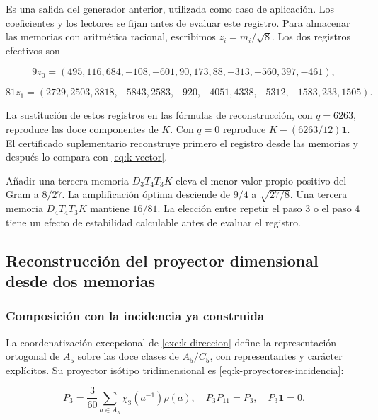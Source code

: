 Es una salida del generador anterior, utilizada como caso de
aplicación. Los coeficientes y los lectores se fijan antes de
evaluar este registro. Para almacenar las memorias con aritmética
racional, escribimos \(z_i=m_i/\sqrt8\).
Los dos registros efectivos son



\[
9z_0=(495,116,684,-108,-601,90,173,88,-313,-560,397,-461),
\]





\begin{equation}
81z_1=(2729,2503,3818,-5843,2583,-920,-4051,4338,-5312,-1583,233,1505).
\label{nuc11:eq:11}
\end{equation}



La sustitución de estos registros en las fórmulas de reconstrucción,
con \(q=6263\), reproduce las doce componentes de \(K\).
Con \(q=0\) reproduce \(K-(6263/12)\mathbf1\).
El certificado suplementario reconstruye primero el registro desde
las memorias y después lo compara con \eqref{eq:k-vector}.

Añadir una tercera memoria \(D_3T_4T_3K\) eleva el menor valor
propio positivo del Gram a \(8/27\).
La amplificación óptima desciende de \(9/4\) a \(\sqrt{27/8}\).
Una tercera memoria \(D_4T_4T_3K\) mantiene \(16/81\).
La elección entre repetir el paso \(3\) o el paso \(4\) tiene
un efecto de estabilidad calculable antes de evaluar el registro.

\subsection{Reconstrucción del proyector dimensional desde dos memorias}

\subsubsection{Composición con la incidencia ya construida}

La coordenatización excepcional de \cref{exc:k-direccion} define la
representación ortogonal de \(A_5\) sobre las doce clases de
\(A_5/C_5\), con representantes y carácter explícitos.
Su proyector isótipo tridimensional es
\eqref{eq:k-proyectores-incidencia}:



\begin{equation}
P_3=\frac3{60}\sum_{a\in A_5}\chi_3(a^{-1})\rho(a),
\quad P_3P_{11}=P_3,\quad P_3\mathbf1=0.
\label{nuc11:eq:12}
\end{equation}



